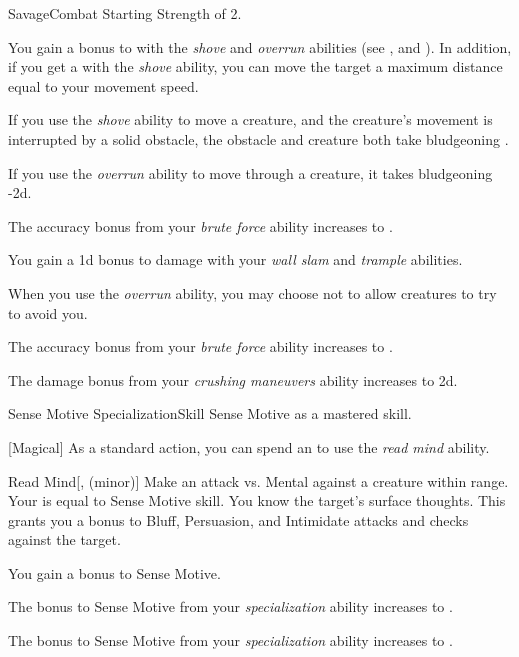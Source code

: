     \begin{feat}{Savage}{Combat}
        \featpre Starting Strength of 2.

         You gain a  bonus to  with the \textit{shove} and \textit{overrun} abilities (see , and ).
        In addition, if you get a  with the \textit{shove} ability, you can move the target a maximum distance equal to your movement speed.

         If you use the \textit{shove} ability to move a creature, and the creature's movement is interrupted by a solid obstacle, the obstacle and creature both take bludgeoning .

         If you use the \textit{overrun} ability to move through a creature, it takes bludgeoning  -2d.

         The accuracy bonus from your \textit{brute force} ability increases to .

         You gain a \plus1d bonus to damage with your \textit{wall slam} and \textit{trample} abilities.

         When you use the \textit{overrun} ability, you may choose not to allow creatures to try to avoid you.

         The accuracy bonus from your \textit{brute force} ability increases to .

         The damage bonus from your \textit{crushing maneuvers} ability increases to \plus2d. 
    \end{feat}

    \begin{feat}{Sense Motive Specialization}{Skill}
        \featpre Sense Motive as a mastered skill.

        [Magical] As a standard action, you can spend an  to use the \textit{read mind} ability.
        \begin{ability}{Read Mind}[,  (minor)]
            Make an attack vs. Mental against a creature within \rngclose range.
            Your  is equal to Sense Motive skill.
            \hit You know the target's surface thoughts.
            This grants you a  bonus to Bluff, Persuasion, and Intimidate attacks and checks against the target.
        \end{ability}

         You gain a  bonus to Sense Motive.

         The bonus to Sense Motive from your \textit{specialization} ability increases to .

         The bonus to Sense Motive from your \textit{specialization} ability increases to .
    \end{feat}

